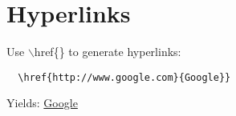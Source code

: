 

\newpage
\section{Hyperlinks}
Use $\backslash$href\{\} to generate hyperlinks:

\begin{verbatim}
  \href{http://www.google.com}{Google}}
\end{verbatim}

\noindent Yields: \href{http://www.google.com}{Google}
